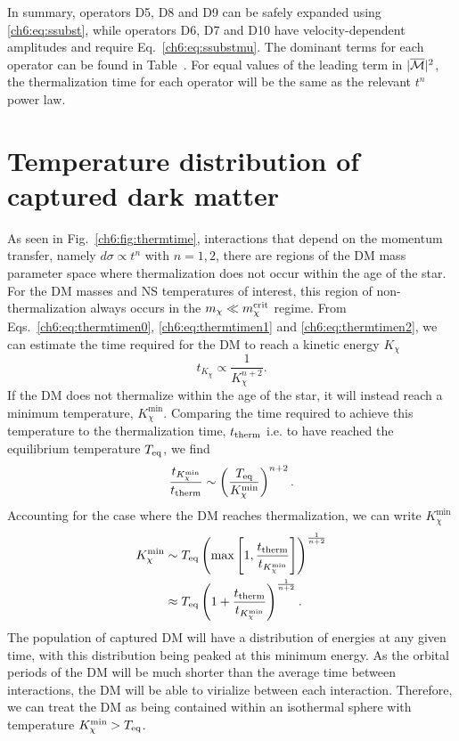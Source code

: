In summary, operators D5, D8 and D9 can be safely expanded using \ref{ch6:eq:ssubst}, while operators D6, D7 and D10 have velocity-dependent amplitudes and require Eq.~\ref{ch6:eq:ssubstmu}. 
The dominant terms for each operator can be found in Table~. 
For equal values of the leading term in $|\overline{\mathcal M}|^2$, the thermalization time for each operator will be the same as the relevant $t^n$ power law. 


\section{Temperature distribution of captured dark matter}
\label{ch6:sec:minTempDerivation}



As seen in Fig.~\ref{ch6:fig:thermtime}, interactions that depend on the momentum transfer, namely $d\sigma \propto t^n$ with $n = 1,2$, there are regions of the DM mass parameter space where thermalization does not occur within the age of the star. For the DM masses and NS temperatures of interest, this region of non-thermalization always occurs in the $m_\chi\ll m_\chi^{\rm crit}$ regime.
From Eqs.~\ref{ch6:eq:thermtimen0}, \ref{ch6:eq:thermtimen1} and \ref{ch6:eq:thermtimen2},  we can estimate the time required for the DM to reach a kinetic energy $K_\chi$ 
\begin{equation}
    t_{K_\chi} \propto \frac{1}{K_\chi^{n+2}}.
\end{equation}
% 
If the DM does not thermalize within the age of the star, it will instead reach a minimum temperature, $K_\chi^{\mathrm{min}}$.  Comparing the time required to achieve this temperature to the thermalization time, $t_{\rm therm}$ i.e. to have reached the equilibrium temperature $T_{\rm eq}$, we find 
\begin{equation}
    \frac{t_{K_\chi^\mathrm{min}}}{t_{\rm therm}}  \sim \left( \frac{T_{\rm eq}}{K^{\rm min}_\chi} \right)^{n+2}. 
\end{equation}
Accounting for the case where the DM reaches thermalization, we can write $K_\chi^\mathrm{min}$
\begin{align}
    K^{\rm min}_\chi & \sim T_{\rm eq} \left(\max\left[ 1,\frac{t_{\rm therm}}{t_{K_\chi^\mathrm{min}}}\right ]\right)^{\frac{1}{n + 2}}\\
           & \approx T_{\rm eq} \left( 1 + \frac{t_{\rm therm}}{t_{K_\chi^\mathrm{min}}}\right )^{\frac{1}{n + 2}}. 
\end{align}
The population of captured DM will have a distribution of energies at any given time, with this distribution being peaked at this minimum energy.
As the orbital periods of the DM will be much shorter than the average time between interactions, the DM will be able to virialize between each interaction. Therefore, we can treat the DM as being contained within an isothermal sphere with temperature $K^{\rm min}_\chi > T_{\rm eq}$. 

